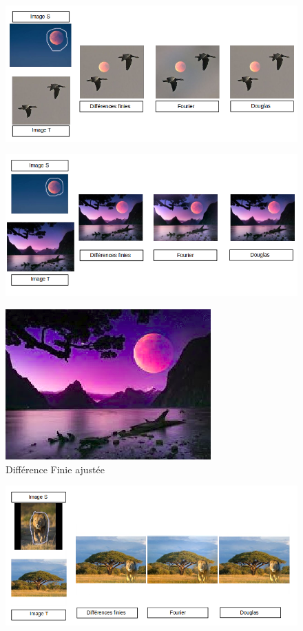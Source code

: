 \begin{figure}[!h]
\centering
\includegraphics[scale=0.5]{Images/Resultats/1.png}
\end{figure}

\begin{figure}[!h]
\centering
\includegraphics[scale=0.5]{Images/Resultats/2.png}
\end{figure}

\begin{figure}[!h]
\centering
\includegraphics[scale=0.5]{Images/Resultats/LuneDFChangeSel.png}
\caption{Différence Finie ajustée}
\end{figure}


\begin{figure}[!h]
\centering
\includegraphics[scale=0.5]{Images/Resultats/3.png}
\end{figure}

